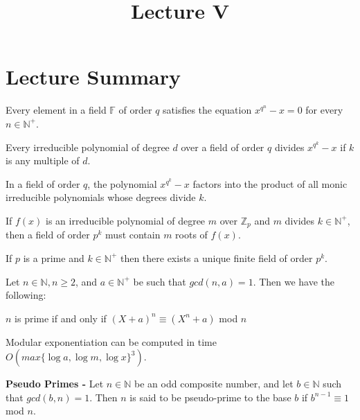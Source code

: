 \documentclass[a4paper]{article}
\title{\vspace{-2cm}Lecture V\vspace{-2cm}}
\date{}
\begin{document}
\maketitle
\section{Lecture Summary}
\begin{theorem}
Every element in a field $\mathbb{F}$ of order $q$ satisfies the equation $x^{q^{n}} - x = 0$ for every $n \in \mathbb{N}^{+}$.
\end{theorem}


\begin{theorem}
Every irreducible polynomial of degree $d$ over a field of order $q$ divides $x^{q^{k}} - x$ if $k$ is any multiple of $d$.
\end{theorem}


\begin{theorem}
In a field of order $q$, the polynomial $x^{q^{k}} - x$ factors into the product of all monic irreducible polynomials whose degrees divide $k$.
\end{theorem}


\begin{theorem}
If $f(x)$ is an irreducible polynomial of degree $m$ over $\mathbb{Z}_{p}$ and $m$ divides $k \in \mathbb{N}^{+}$, then a field of order $p^{k}$ must contain $m$ roots of $f(x)$.
\end{theorem}


\begin{theorem}
If $p$ is a prime and $k \in \mathbb{N}^{+}$ then there exists a unique finite field of order $p^{k}$.
\end{theorem}


\begin{theorem}
Let $n \in \mathbb{N}, n \geq 2$, and $a \in \mathbb{N}^{+}$ be such that $gcd(n, a) = 1$. Then we have the following:
\begin{center}
$n$ is prime if and only if $(X + a)^{n} \equiv (X^{n} + a)$ mod $n$
\end{center}
\end{theorem}


\begin{theorem}
Modular exponentiation can be computed in time \\ $O(max\{\log{a}, \log{m}, \log{x} \}^{3})$.
\end{theorem}


\begin{definition}
\textbf{Pseudo Primes -} Let $n \in \mathbb{N}$ be an odd composite number, and let $b \in \mathbb{N}$ such that $gcd(b, n) = 1$. Then $n$ is said to be pseudo-prime to the base $b$ if $b^{n-1} \equiv 1$ mod $n$.
\end{definition}
\end{document}
